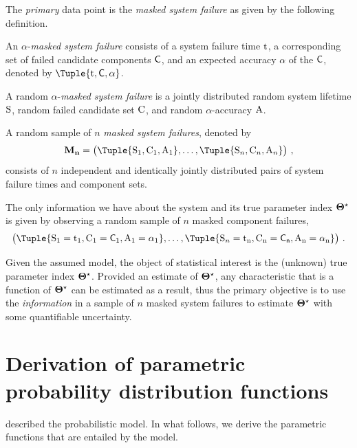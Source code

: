 \documentclass[
    11pt,
    extrafontsizes,
    article,
    oldfontcommands,
    final,
    oneside,
    openany,
    hidelinks]{memoir}
\begin{document}
The \emph{primary} data point is the \emph{masked system failure} as given by the following definition.
\begin{definition}
An $\alpha$-\emph{masked system failure} consists of a system failure time $\rm{t}$, a corresponding set of failed candidate components $\cand$, and an expected accuracy $\alpha$ of the $\cand$, denoted by $\Tuple{\ti,\cand,\alpha}$.
\end{definition}
\begin{assumption}
\label{asm:cand_prob}
A random $\alpha$-\emph{masked system failure} is a jointly distributed random system lifetime $\mathrm{S}$, random failed candidate set $\mathrm{C}$, and random $\alpha$-accuracy $\mathrm{A}$.
\end{assumption}

\begin{assumption}
\label{def:msfs}
A random sample of $n$ \emph{masked system failures}, denoted by
\begin{equation}
\mfs = \left( \Tuple{\sv_1,\rvcand_1,\RV{A}_1},\ldots,\Tuple{\sv_n,\rvcand_n,\RV{A}_n}\right)\,,
\end{equation}
consists of $n$ independent and identically jointly distributed pairs of system failure times and component sets.
\end{assumption}

\begin{assumption}
The only information we have about the system and its true parameter index ${\boldsymbol{\Theta}}^{\star}$ is given by observing a random sample of $n$ masked component failures,
\begin{equation}
    \left(
    	\Tuple{\sv_1=\ti_1,\rvcand_1=\Set{C}[1], \RV{A}_1=\alpha_1}, \ldots, 
    	\Tuple{\sv_n=\ti_n,\rvcand_n=\Set{C}[n], \RV{A}_n=\alpha_n}
    \right)\,.
\end{equation}
\end{assumption}

Given the assumed model, the object of statistical interest is the (unknown) true parameter index ${\boldsymbol{\Theta}}^{\star}$.
Provided an estimate of ${\boldsymbol{\Theta}}^{\star}$, any characteristic that is a function of ${\boldsymbol{\Theta}}^{\star}$ can be estimated as a result, thus the primary objective is to use the \emph{information} in a sample of $n$ masked system failures to estimate ${\boldsymbol{\Theta}}^{\star}$ with some quantifiable uncertainty.

\label{sec:distribution_functions}
\chapter{Derivation of parametric probability distribution functions}
 described the probabilistic model. In what follows, we derive the parametric functions that are entailed by the model.
\end{document}

